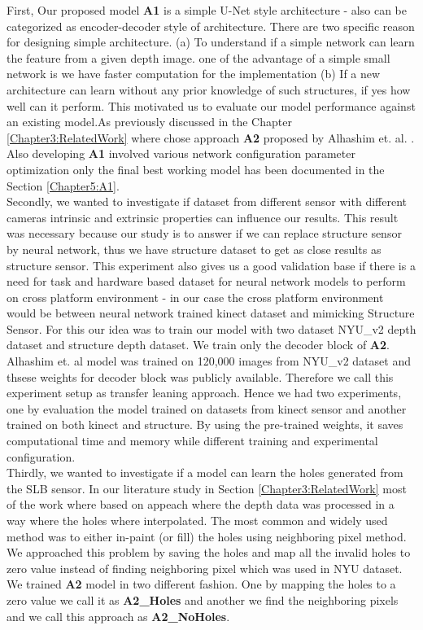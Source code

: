 First, Our proposed model \textbf{A1} is a simple U-Net style architecture - also can be categorized as encoder-decoder style of architecture. There are two specific reason for designing simple architecture. (a) To understand if a simple network can learn the feature from a given depth image. one of the advantage of a simple small network is we have faster computation for the implementation (b) If a new architecture can learn without any prior knowledge of such structures, if yes how well can it perform. This motivated us to evaluate our model performance against an existing model.As previously discussed in the Chapter \ref{Chapter3:RelatedWork}  where chose approach \textbf{A2} proposed by Alhashim et. al. \cite{Alhashim2018} . Also developing \textbf{A1} involved various network configuration parameter optimization only the final best working model has been documented in the Section \ref{Chapter5:A1}. \\

Secondly, we wanted to investigate if dataset from different sensor with different cameras intrinsic and extrinsic properties can influence our results.  This result was necessary because our study is to answer if we can replace structure sensor by neural network, thus we have structure dataset to get as close results as structure sensor. This experiment also gives us a good validation base if there is a need for task and hardware based dataset for neural network models to perform on cross platform environment - in our case  the cross platform environment would be between neural network trained kinect dataset and mimicking Structure Sensor. For this our idea was to train our model with two dataset NYU\_v2 depth dataset and structure depth dataset. We train only the decoder block of \textbf{A2}. Alhashim et. al \cite{Alhashim2018} model was trained on 120,000 images from NYU\_v2 dataset and thsese weights for decoder block was publicly available. Therefore we call this experiment setup as transfer leaning approach. Hence we had two experiments, one by evaluation the model trained on  datasets from kinect sensor and another trained on both kinect and structure. By using the pre-trained weights, it saves computational time and memory while different training and experimental configuration. \\

Thirdly, we wanted to investigate if a model can learn the holes generated from the SLB sensor. In our literature study in Section \ref{Chapter3:RelatedWork} most of the work where based on appeach where the depth data was processed  in a way where the holes where interpolated. The most common and widely used method was to either in-paint (or fill) the holes using neighboring pixel \cite{silberman11indoor} method. We approached this problem by saving the holes and map all the invalid holes to zero value instead of finding neighboring pixel which was used in NYU dataset. We trained \textbf{A2} model in two different fashion. One by mapping the holes to a zero value we call it as \textbf{A2\_Holes} and another we find the neighboring pixels and we call this approach as \textbf{A2\_NoHoles}.

